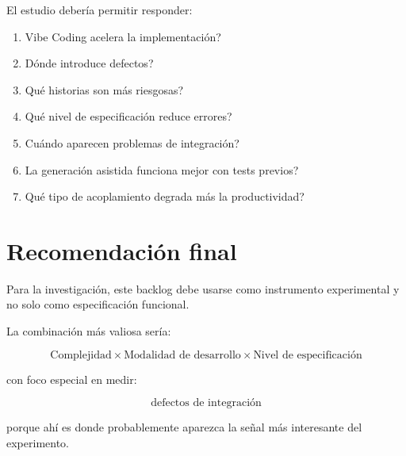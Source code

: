 \documentclass[11pt,a4paper]{article}
\begin{document}
El estudio deber\'ia permitir responder:

\begin{enumerate}[leftmargin=*]
    \item \textquestiondown Vibe Coding acelera la implementaci\'on?
    \item \textquestiondown D\'onde introduce defectos?
    \item \textquestiondown Qu\'e historias son m\'as riesgosas?
    \item \textquestiondown Qu\'e nivel de especificaci\'on reduce errores?
    \item \textquestiondown Cu\'ando aparecen problemas de integraci\'on?
    \item \textquestiondown La generaci\'on asistida funciona mejor con tests previos?
    \item \textquestiondown Qu\'e tipo de acoplamiento degrada m\'as la productividad?
\end{enumerate}

\section{Recomendaci\'on final}

Para la investigaci\'on, este backlog debe usarse como instrumento experimental y no solo como especificaci\'on funcional.

La combinaci\'on m\'as valiosa ser\'ia:

\begin{equation}
\text{Complejidad}
\times
\text{Modalidad de desarrollo}
\times
\text{Nivel de especificaci\'on}
\end{equation}

con foco especial en medir:

\begin{equation}
\text{defectos de integraci\'on}
\end{equation}

porque ah\'i es donde probablemente aparezca la se\~nal m\'as interesante del experimento.
\end{document}
